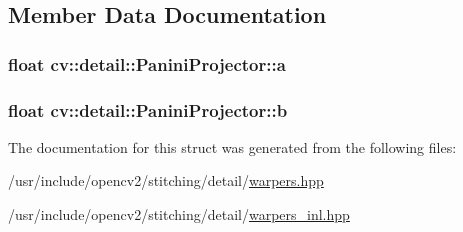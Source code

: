 \subsection{Member Data Documentation}
\hypertarget{structcv_1_1detail_1_1PaniniProjector_aded47ba50b525d0785de5337af62d9ef}{
\subsubsection[{a}]{\setlength{\rightskip}{0pt plus 5cm}float cv\-::detail\-::\-Panini\-Projector\-::a}}\label{structcv_1_1detail_1_1PaniniProjector_aded47ba50b525d0785de5337af62d9ef}
\hypertarget{structcv_1_1detail_1_1PaniniProjector_af5a5bba5e4d49373d05901caef8c4817}{
\subsubsection[{b}]{\setlength{\rightskip}{0pt plus 5cm}float cv\-::detail\-::\-Panini\-Projector\-::b}}\label{structcv_1_1detail_1_1PaniniProjector_af5a5bba5e4d49373d05901caef8c4817}


The documentation for this struct was generated from the following files\-:\begin{DoxyCompactItemize}
\item 
/usr/include/opencv2/stitching/detail/\hyperlink{detail_2warpers_8hpp}{warpers.\-hpp}\item 
/usr/include/opencv2/stitching/detail/\hyperlink{warpers__inl_8hpp}{warpers\-\_\-inl.\-hpp}\end{DoxyCompactItemize}
